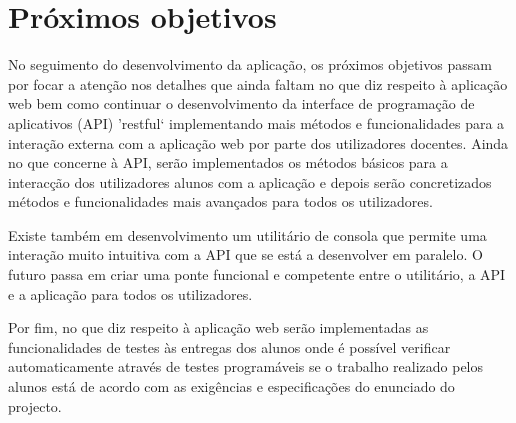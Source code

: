 \section{Próximos objetivos}
No seguimento do desenvolvimento da aplicação, os próximos objetivos passam por focar a atenção nos detalhes que ainda faltam no que diz respeito à aplicação web bem como continuar o desenvolvimento da interface de programação de aplicativos (API) 'restful` implementando mais métodos e funcionalidades para a interação externa com a aplicação web por parte dos utilizadores docentes. Ainda no que concerne à API, serão implementados os métodos básicos para a interacção dos utilizadores alunos com a aplicação e depois serão concretizados métodos e funcionalidades mais avançados para todos os utilizadores. 

Existe também em desenvolvimento um utilitário de consola que permite uma interação muito intuitiva com a API que se está a desenvolver em paralelo. O futuro passa em criar uma ponte funcional e competente entre o utilitário, a API e a aplicação para todos os utilizadores.

Por fim, no que diz respeito à aplicação web serão implementadas as funcionalidades de testes às entregas dos alunos onde é possível verificar automaticamente através de testes programáveis se o trabalho realizado pelos alunos está de acordo com as exigências e especificações do enunciado do projecto.

\newpage